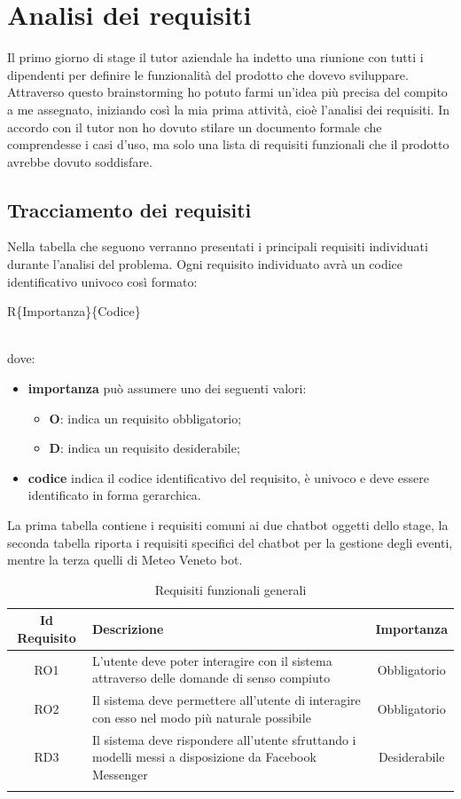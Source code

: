 
\chapter{Analisi dei requisiti}
\label{cap:analisi}

Il primo giorno di stage il tutor aziendale ha indetto una riunione con tutti i dipendenti per definire le funzionalità del prodotto che dovevo sviluppare. Attraverso questo \gls{brainstorming} ho potuto farmi un'idea più precisa del compito a me assegnato, iniziando così la mia prima attività, cioè l'analisi dei requisiti. In accordo con il tutor non ho dovuto stilare un documento formale che comprendesse i casi d'uso, ma solo una lista di requisiti funzionali che il prodotto avrebbe dovuto soddisfare.

\section{Tracciamento dei requisiti}
Nella tabella che seguono verranno presentati i principali requisiti individuati durante l’analisi del problema.
Ogni requisito individuato avrà un codice identificativo univoco così formato: \\
\centerline{R\{Importanza\}\{Codice\}} \\ 
dove:
\begin{itemize}
	\item \textbf{importanza} può assumere uno dei seguenti valori:
	\begin{itemize}
		\item \textbf{O}: indica un requisito obbligatorio;
		\item \textbf{D}: indica un requisito desiderabile;
	\end{itemize}
	\item \textbf{codice} indica il codice identificativo del requisito, è univoco e deve essere
identificato in forma gerarchica.
\end{itemize}

La prima tabella contiene i requisiti comuni ai due \gls{chatbot} oggetti dello stage, la seconda tabella riporta i requisiti specifici del \gls{chatbot} per la gestione degli eventi, mentre la terza quelli di Meteo Veneto bot.

\normalsize
\begin{longtable}{|c|>{\centering}m{7cm}|c|}
\hline
\textbf{Id Requisito} & \textbf{Descrizione} & \textbf{Importanza}\\
\hline
\endhead
RO1 & L'utente deve poter interagire con il sistema attraverso delle domande di senso compiuto & Obbligatorio\\ 
RO2 & Il sistema deve permettere all'utente di interagire con esso nel modo più naturale possibile & Obbligatorio \\
RD3 & Il sistema deve rispondere all'utente sfruttando i modelli messi a disposizione da Facebook Messenger & Desiderabile\\
\hline
\caption{Requisiti funzionali generali}
\end{longtable}

